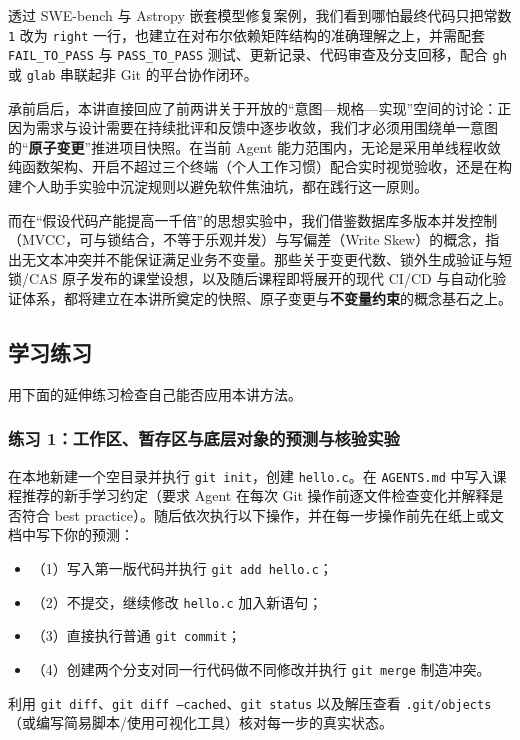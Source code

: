 \documentclass[UTF8,a4paper,11pt,fontset=fandol]{ctexart}
\begin{document}
透过 SWE-bench 与 Astropy 嵌套模型修复案例，我们看到哪怕最终代码只把常数 \texttt{1} 改为 \texttt{right} 一行，也建立在对布尔依赖矩阵结构的准确理解之上，并需配套 \texttt{FAIL\_TO\_PASS} 与 \texttt{PASS\_TO\_PASS} 测试、更新记录、代码审查及分支回移，配合 \texttt{gh} 或 \texttt{glab} 串联起非 Git 的平台协作闭环。



承前启后，本讲直接回应了前两讲关于开放的“意图—规格—实现”空间的讨论：正因为需求与设计需要在持续批评和反馈中逐步收敛，我们才必须用围绕单一意图的“\textbf{原子变更}”推进项目快照。在当前 Agent 能力范围内，无论是采用单线程收敛纯函数架构、开启不超过三个终端（个人工作习惯）配合实时视觉验收，还是在构建个人助手实验中沉淀规则以避免软件焦油坑，都在践行这一原则。

而在“假设代码产能提高一千倍”的思想实验中，我们借鉴数据库多版本并发控制（MVCC，可与锁结合，不等于乐观并发）与写偏差（Write Skew）的概念，指出无文本冲突并不能保证满足业务不变量。那些关于变更代数、锁外生成验证与短锁/CAS 原子发布的课堂设想，以及随后课程即将展开的现代 CI/CD 与自动化验证体系，都将建立在本讲所奠定的快照、原子变更与\textbf{不变量约束}的概念基石之上。

\subsection{学习练习}

用下面的延伸练习检查自己能否应用本讲方法。

\subsubsection*{练习 1：工作区、暂存区与底层对象的预测与核验实验}

在本地新建一个空目录并执行 \texttt{git init}，创建 \texttt{hello.c}。在 \texttt{AGENTS.md} 中写入课程推荐的新手学习约定（要求 Agent 在每次 Git 操作前逐文件检查变化并解释是否符合 best practice）。随后依次执行以下操作，并在每一步操作前先在纸上或文档中写下你的预测：

\begin{itemize}
\item （1）写入第一版代码并执行 \texttt{git add hello.c}；

\item （2）不提交，继续修改 \texttt{hello.c} 加入新语句；

\item （3）直接执行普通 \texttt{git commit}；

\item （4）创建两个分支对同一行代码做不同修改并执行 \texttt{git merge} 制造冲突。

\end{itemize}
利用 \texttt{git diff}、\texttt{git diff --cached}、\texttt{git status} 以及解压查看 \texttt{.git/objects}（或编写简易脚本/使用可视化工具）核对每一步的真实状态。
\end{document}
